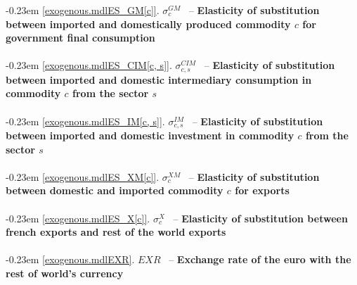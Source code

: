 \documentclass[12pt]{article}
\numberwithin{equation}{section}
\begin{document}
\noindent \kern-0.23em \noindent \begingroup {} \label{exogenous.mdlES_GM[c]}\ref{exogenous.mdlES_GM[c]}.
         
        \ensuremath{\sigma^{GM}_{c}}~ \endgroup -- \noindent \textbf{Elasticity of substitution between imported and domestically produced commodity $c$ for government final consumption}  \\ \\[-8pt]


\noindent \kern-0.23em \noindent \begingroup {} \label{exogenous.mdlES_CIM[c, s]}\ref{exogenous.mdlES_CIM[c, s]}.
         
        \ensuremath{\sigma^{CIM}_{c, s}}~ \endgroup -- \noindent \textbf{Elasticity of substitution between imported and domestic intermediary consumption in commodity $c$ from the sector $s$}  \\ \\[-8pt]


\noindent \kern-0.23em \noindent \begingroup {} \label{exogenous.mdlES_IM[c, s]}\ref{exogenous.mdlES_IM[c, s]}.
         
        \ensuremath{\sigma^{IM}_{c, s}}~ \endgroup -- \noindent \textbf{Elasticity of substitution between imported and domestic investment in commodity $c$ from the sector $s$}  \\ \\[-8pt]


\noindent \kern-0.23em \noindent \begingroup {} \label{exogenous.mdlES_XM[c]}\ref{exogenous.mdlES_XM[c]}.
         
        \ensuremath{\sigma^{XM}_{c}}~ \endgroup -- \noindent \textbf{Elasticity of substitution between domestic and imported commodity $c$ for exports}  \\ \\[-8pt]


\noindent \kern-0.23em \noindent \begingroup {} \label{exogenous.mdlES_X[c]}\ref{exogenous.mdlES_X[c]}.
         
        \ensuremath{\sigma^{X}_{c}}~ \endgroup -- \noindent \textbf{Elasticity of substitution between french exports and rest of the world exports}  \\ \\[-8pt]


\noindent \kern-0.23em \noindent \begingroup {} \label{exogenous.mdlEXR}\ref{exogenous.mdlEXR}.
         
        \ensuremath{EXR}~ \endgroup -- \noindent \textbf{Exchange rate of the euro with the rest of world's currency}  \\ \\[-8pt]
\end{document}

